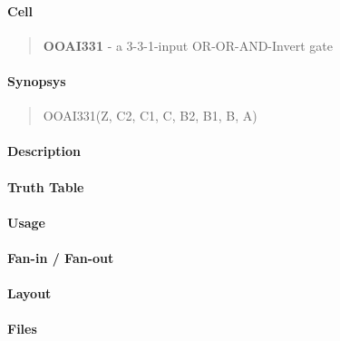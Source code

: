 \label{OOAI331}
\paragraph{Cell}
\begin{quote}
    \textbf{OOAI331} - a 3-3-1-input OR-OR-AND-Invert gate
\end{quote}

\paragraph{Synopsys}
\begin{quote}
    OOAI331(Z, C2, C1, C, B2, B1, B, A)
\end{quote}

\paragraph{Description}



\paragraph{Truth Table}


\paragraph{Usage}

\paragraph{Fan-in / Fan-out}

\paragraph{Layout}

\paragraph{Files}
